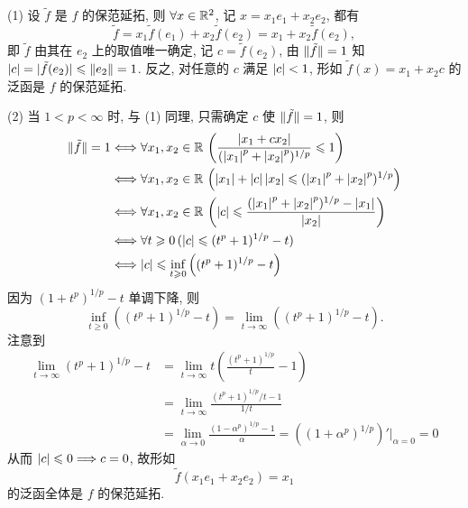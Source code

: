     \begin{Proof}
        (1) 设 $ \tilde{f} $ 是 $ f $ 的保范延拓, 则 $ \forall x\in\mathbb{R}^{2} $, 记 $ x=x_{1}e_{1}+x_{2}e_{2} $, 都有
        \[
            \tilde{f} = x_{1}\tilde{f}(e_{1})+x_{2}\tilde{f}(e_{2})=x_{1}+x_{2}\tilde{f}(e_{2}),
        \]
        即 $ \tilde{f} $ 由其在 $ e_{2} $ 上的取值唯一确定, 记 $ c=\tilde{f}(e_{2}) $, 由 $ \lVert \tilde{f}\rVert=1 $ 知 $ \left| c \right| =\lvert \tilde{f}(e_{2})\rvert\leqslant\left\| e_{2} \right\|=1 $. 反之, 对任意的 $ c $ 满足 $ \left| c \right| <1 $, 形如 $ \tilde{f}(x)=x_{1}+x_{2}c $ 的泛函是 $ f $ 的保范延拓.

        (2) 当 $ 1<p<\infty $ 时, 与 (1) 同理, 只需确定 $ c $ 使 $ \lVert \tilde{f}\rVert=1 $, 则
        \[
            \begin{aligned}
                \lVert \tilde{f}\rVert=1 & \Longleftrightarrow \forall x_{1}, x_{2}\in\mathbb{R}\,\left( \frac{\left| x_{1}+cx_{2} \right| }{(\left| x_{1} \right| ^{p}+\left| x_{2} \right| ^{p})^{1/p}}\leqslant1 \right)\\
                & \Longleftrightarrow\forall x_{1}, x_{2}\in\mathbb{R}\,\left(\left| x_{1} \right| +\left| c \right| \left| x_{2} \right| \leqslant(\left| x_{1} \right| ^{p}+\left| x_{2} \right| ^{p})^{1/p} \right)\\
                & \Longleftrightarrow \forall x_{1}, x_{2}\in\mathbb{R}\,\left( \left| c \right| \leqslant\frac{(\left| x_{1} \right| ^{p}+\left| x_{2} \right| ^{p})^{1/p}-\left| x_{1} \right| }{\left| x_{2} \right| } \right)\\
                & \Longleftrightarrow \forall t\geqslant0\,(\left| c \right| \leqslant(t^{p}+1)^{1/p}-t)\\
                &\Longleftrightarrow \left| c \right| \leqslant\inf_{t\geqslant0}\left( (t^{p}+1)^{1/p}-t \right)
            \end{aligned}
        \]
        因为 $ (1+t^{p})^{1/p}-t $ 单调下降, 则
        \[
            \inf_{t\geqslant0}\left( (t^{p}+1)^{1/p}-t \right)=\lim_{t\to\infty}\left( (t^{p}+1)^{1/p}-t \right).
        \]
        注意到
        \[
            \begin{aligned}
                \lim_{t\to\infty}(t^{p}+1)^{1/p}-t & =\lim_{t\to\infty}t\left( \frac{(t^{p}+1)^{1/p}}{t}-1 \right)\\
                & = \lim_{t\to\infty}\frac{(t^{p}+1)^{1/p}/t-1}{1/t}\\
                & = \lim_{\alpha\to0}\frac{(1-\alpha^{p})^{1/p}-1}{\alpha}=\left( (1+\alpha^{p})^{1/p} \right)'\Big|_{\alpha=0}=0
            \end{aligned}
        \]
        从而 $ \left| c \right| \leqslant0\Longrightarrow c=0 $, 故形如
        \[
            \tilde{f}(x_{1}e_{1}+x_{2}e_{2})=x_{1}
        \]
        的泛函全体是 $ f $ 的保范延拓.


\end{Proof}
